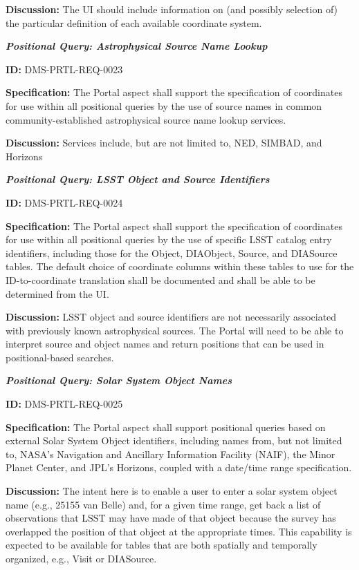 \documentclass[SE,toc,lsstdraft]{lsstdoc}
\begin{document}
\textbf{Discussion:}
The UI should include information on (and possibly selection of) the particular definition of each available coordinate system.

\textbf{\textit{Positional Query: Astrophysical Source Name Lookup}}

\label{DMS-PRTL-REQ-0023}
\textbf{ID:} DMS-PRTL-REQ-0023

\textbf{Specification:}
The Portal aspect shall support the specification of coordinates for use within all positional queries by the use of source names in common community-established astrophysical source name lookup services.

\textbf{Discussion:}
Services include, but are not limited to, NED, SIMBAD, and Horizons

\textbf{\textit{Positional Query: LSST Object and Source Identifiers}}

\label{DMS-PRTL-REQ-0024}
\textbf{ID:} DMS-PRTL-REQ-0024

\textbf{Specification:}
The Portal aspect shall support the specification of coordinates for use within all positional queries by the use of specific LSST catalog entry identifiers, including those for the Object, DIAObject, Source, and DIASource tables.  The default choice of coordinate columns within these tables to use for the ID-to-coordinate translation shall be documented and shall be able to be determined from the UI.

\textbf{Discussion:}
LSST object and source identifiers are not necessarily associated with previously known astrophysical sources.  The Portal will need to be able to interpret source and object names and return positions that can be used in positional-based searches.

\textbf{\textit{Positional Query: Solar System Object Names}}

\label{DMS-PRTL-REQ-0025}
\textbf{ID:} DMS-PRTL-REQ-0025

\textbf{Specification:}
The Portal aspect shall support positional queries based on external Solar System Object identifiers, including names from, but not limited to, NASA’s Navigation and Ancillary Information Facility (NAIF), the Minor Planet Center, and JPL’s Horizons, coupled with a date/time range specification.

\textbf{Discussion:}
The intent here is to enable a user to enter a solar system object name (e.g., 25155 van Belle) and, for a given time range, get back a list of observations that LSST may have made of that object because the survey has overlapped the position of that object at the appropriate times.
This capability is expected to be available for tables that are both spatially and temporally organized, e.g., Visit or DIASource.
\end{document}
